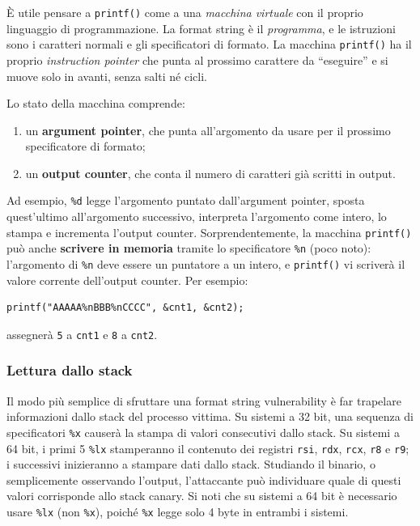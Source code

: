 \documentclass{article}
\begin{document}
È utile pensare a \texttt{printf()} come a una \textit{macchina virtuale} con il proprio linguaggio di programmazione. La format string è il \textit{programma}, e le istruzioni sono i caratteri normali e gli specificatori di formato. La macchina \texttt{printf()} ha il proprio \textit{instruction pointer} che punta al prossimo carattere da ``eseguire'' e si muove solo in avanti, senza salti né cicli.

Lo stato della macchina comprende:
\begin{enumerate}
    \item un \textbf{argument pointer}, che punta all'argomento da usare per il prossimo specificatore di formato;
    \item un \textbf{output counter}, che conta il numero di caratteri già scritti in output.
\end{enumerate}

Ad esempio, \texttt{\%d} legge l'argomento puntato dall'argument pointer, sposta quest'ultimo all'argomento successivo, interpreta l'argomento come intero, lo stampa e incrementa l'output counter. Sorprendentemente, la macchina \texttt{printf()} può anche \textbf{scrivere in memoria} tramite lo specificatore \texttt{\%n} (poco noto): l'argomento di \texttt{\%n} deve essere un puntatore a un intero, e \texttt{printf()} vi scriverà il valore corrente dell'output counter. Per esempio:

\begin{verbatim}
printf("AAAAA%nBBB%nCCCC", &cnt1, &cnt2);
\end{verbatim}

assegnerà \texttt{5} a \texttt{cnt1} e \texttt{8} a \texttt{cnt2}.

\subsubsection*{Lettura dallo stack}

Il modo più semplice di sfruttare una format string vulnerability è far trapelare informazioni dallo stack del processo vittima. Su sistemi a 32 bit, una sequenza di specificatori \texttt{\%x} causerà la stampa di valori consecutivi dallo stack. Su sistemi a 64 bit, i primi 5 \texttt{\%lx} stamperanno il contenuto dei registri \texttt{rsi}, \texttt{rdx}, \texttt{rcx}, \texttt{r8} e \texttt{r9}; i successivi inizieranno a stampare dati dallo stack. Studiando il binario, o semplicemente osservando l'output, l'attaccante può individuare quale di questi valori corrisponde allo stack canary. Si noti che su sistemi a 64 bit è necessario usare \texttt{\%lx} (non \texttt{\%x}), poiché \texttt{\%x} legge solo 4 byte in entrambi i sistemi.
\end{document}
